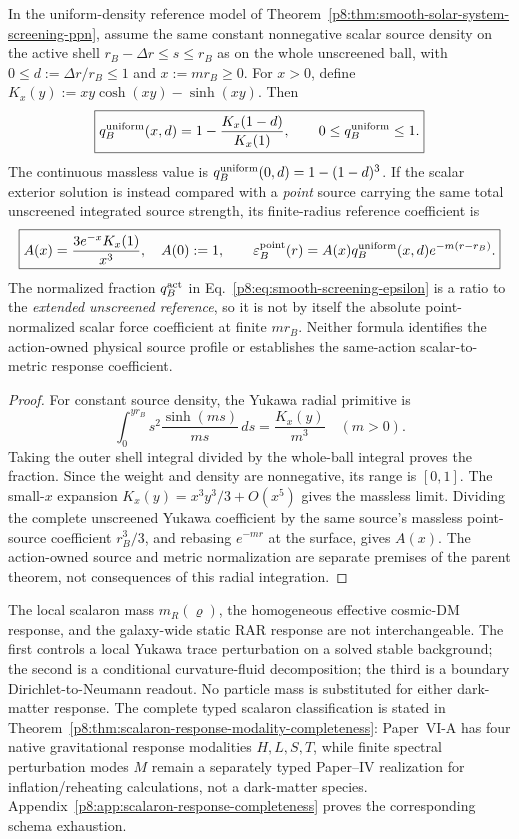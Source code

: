 \documentclass[12pt,a4paper]{article}
\begin{document}
\begin{proposition}
\label{p8:prop:v2262-uniform-shell-yukawa-reference}
In the uniform-density reference model of
Theorem~\ref{p8:thm:smooth-solar-system-screening-ppn}, assume the same
constant nonnegative scalar source density on the active shell
\(r_B-\Delta r\le s\le r_B\) as on the whole unscreened ball,
with \(0\le d:=\Delta r/r_B\le1\) and \(x:=mr_B\ge0\).
For \(x>0\), define \(K_x(y):=xy\cosh(xy)-\sinh(xy)\). Then
\[
 \boxed{q_B^{\rm uniform}(x,d)
 =1-\frac{K_x(1-d)}{K_x(1)},\qquad 0\le q_B^{\rm uniform}\le1.}
\]
The continuous massless value is
\(q_B^{\rm uniform}(0,d)=1-(1-d)^3\).
If the scalar exterior solution is instead compared with a \emph{point}
source carrying the same total unscreened integrated source strength,
its finite-radius reference coefficient is
\[
 \boxed{A(x)=\frac{3e^{-x}K_x(1)}{x^3},\quad A(0):=1,\qquad
 \varepsilon_B^{\rm point}(r)=
 A(x)q_B^{\rm uniform}(x,d)e^{-m(r-r_B)}.}
\]
The normalized fraction \(q_B^{\rm act}\) in
Eq.~\eqref{p8:eq:smooth-screening-epsilon} is a ratio to the
\emph{extended unscreened reference}, so it is not by itself the absolute
point-normalized scalar force coefficient at finite \(mr_B\).
Neither formula identifies the action-owned physical source profile or
establishes the same-action scalar-to-metric response coefficient.
\end{proposition}
\begin{proof}
For constant source density, the Yukawa radial primitive is
\[
 \int_0^{yr_B}s^2\frac{\sinh(ms)}{ms}\,ds
 =\frac{K_x(y)}{m^3}\quad (m>0).
\]
Taking the outer shell integral divided by the whole-ball integral
proves the fraction. Since the weight and density are nonnegative,
its range is \([0,1]\). The small-\(x\) expansion
\(K_x(y)=x^3y^3/3+O(x^5)\) gives the massless limit.
Dividing the complete unscreened Yukawa coefficient by the same
source's massless point-source coefficient \(r_B^3/3\), and
rebasing \(e^{-mr}\) at the surface, gives \(A(x)\).
The action-owned source and metric normalization are separate premises
of the parent theorem, not consequences of this radial integration.
\end{proof}

\begin{remark}
\label{p8:rem:three-scalaron-readouts}
The local scalaron mass $m_R(\varrho)$, the homogeneous effective cosmic-DM
response, and the galaxy-wide static RAR response are not interchangeable.
The first controls a local Yukawa trace perturbation on a solved stable
background; the second is a conditional curvature-fluid decomposition; the
third is a boundary Dirichlet-to-Neumann readout.  No particle mass is
substituted for either dark-matter response.  The complete typed scalaron
classification is stated in
Theorem~\ref{p8:thm:scalaron-response-modality-completeness}: Paper~VI-A has four
native gravitational response modalities $H,L,S,T$, while finite spectral
perturbation modes $M$ remain a separately typed Paper--IV realization for
inflation/reheating calculations, not a dark-matter species.
Appendix~\ref{p8:app:scalaron-response-completeness}
proves the corresponding schema exhaustion.
\end{remark}
\end{document}
